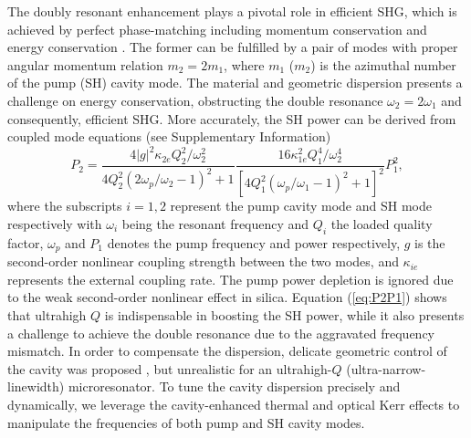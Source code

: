 \documentclass[a4paper,8pt,hyperref, twocolumn]{article}
\begin{document}
The doubly resonant enhancement plays a pivotal role in efficient SHG, which is achieved by perfect phase-matching including momentum conservation and energy conservation \cite{boyd2003nonlinear}.
The former can be fulfilled by a pair of modes with proper angular momentum relation $m_2=2m_1$, where $m_1$ ($m_2$) is the azimuthal number of the pump (SH) cavity mode. 
The material and geometric dispersion presents a challenge on energy conservation, obstructing the double resonance $\omega_2=2\omega_1$ and consequently, efficient SHG. 
More accurately, the SH power can be derived from coupled mode equations (see Supplementary Information)
\begin{equation}
P_2 = \frac{4|g|^2\kappa_{2e}Q_2^2/\omega_2^2}{4Q_2^2(2\omega_p/\omega_2-1)^2+1}\frac{16\kappa_{1e}^2Q_1^4/\omega_2^4}{[4Q_1^2(\omega_p/\omega_1-1)^2+1]^2}P_1^2,
\label{eq:P2P1}
\end{equation}
where the subscripts $i=1, 2$  represent the pump cavity mode and SH mode respectively with $\omega_i$ being the resonant frequency and $Q_i$ the loaded quality factor, $\omega_p$ and $P_1$ denotes the pump frequency and power respectively, $g$ is the second-order nonlinear coupling strength between the two modes, and $\kappa_{ie}$ represents the external coupling rate. The pump power depletion is ignored due to the weak second-order nonlinear effect in silica.
Equation (\ref{eq:P2P1}) shows that ultrahigh $Q$ is indispensable in boosting the SH power, while it also presents a challenge to achieve the double resonance due to the aggravated frequency mismatch. 
In order to compensate the dispersion, delicate geometric control of the cavity was proposed \cite{kozyreff2008whispering, xu2008second}, but unrealistic for an ultrahigh-$Q$ (ultra-narrow-linewidth) microresonator.  
To tune the cavity dispersion precisely and dynamically, we leverage the cavity-enhanced thermal and optical Kerr effects to manipulate the frequencies of both pump and SH cavity modes. 
\end{document}
